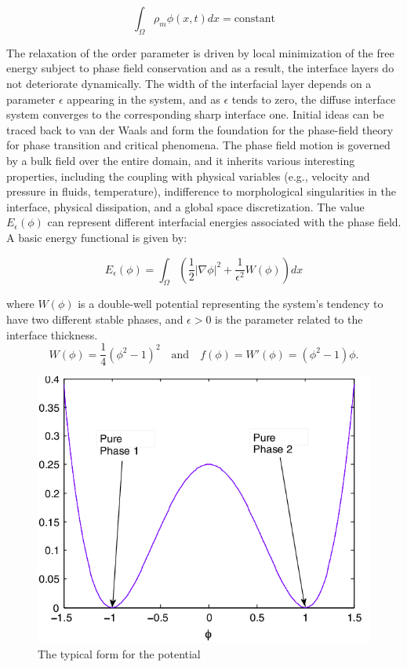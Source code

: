 \documentclass{article}
\begin{document}
\[
\int_{\Omega} \rho_m \phi(x, t) dx = \text{constant}
\]

The relaxation of the order parameter is driven by local minimization of the free energy subject to phase field conservation and as a result, the interface layers do not deteriorate dynamically. The width of the interfacial layer depends on a parameter $\epsilon$ appearing in the system, and as $\epsilon$ tends to zero, the diffuse interface system converges to the corresponding sharp interface one. Initial ideas can be traced back to van der Waals and form the foundation for the phase-field theory for phase transition and critical phenomena. The phase field motion is governed by a bulk field over the entire domain, and it inherits various interesting properties, including the coupling with physical variables (e.g., velocity and pressure in fluids, temperature), indifference to morphological singularities in the interface, physical dissipation, and a global space discretization. The value $E_{\epsilon}(\phi)$ can represent different interfacial energies associated with the phase field. A basic energy functional is given by:

\begin{equation}
E_{\epsilon}(\phi) = \int_{\Omega}\left(\frac{1}{2}|\nabla\phi|^2 + \frac{1}{\epsilon^2}W(\phi)\right)dx
\end{equation}

where $W(\phi)$ is a double-well potential representing the system's tendency to have two different stable phases, and $\epsilon > 0$ is the parameter related to the interface thickness.\\
\begin{equation}
W(\phi) = \frac{1}{4}(\phi^2 - 1)^2 \quad \text{and} \quad f(\phi) = W'(\phi) = (\phi^2 - 1)\phi.
\end{equation}
\begin{figure}[!b]
\begin{center}
\includegraphics[scale=0.4]{doublewell.png}
\caption{The typical form for the potential}\label{Figure1}
\end{center}
\end{figure}
\end{document}
